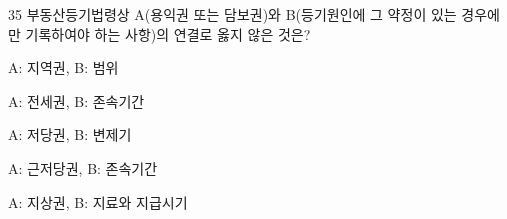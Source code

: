 \begin{question}{35}
부동산등기법령상 A(용익권 또는 담보권)와 B(등기원인에 그 약정이 있는 경우에만 기록하여야 하는 사항)의 연결로 옳지 않은 것은?
\begin{choices}
  \item A: 지역권, B: 범위
  \item A: 전세권, B: 존속기간
  \item A: 저당권, B: 변제기
  \item A: 근저당권, B: 존속기간
  \item A: 지상권, B: 지료와 지급시기
\end{choices}
\end{question}
